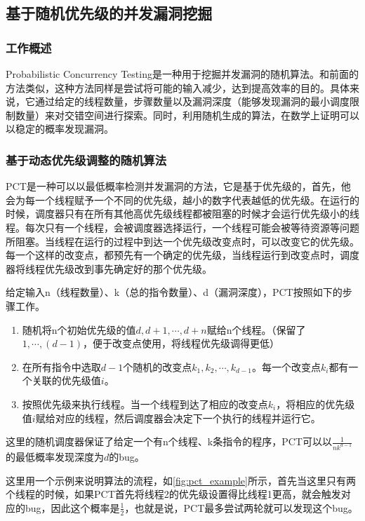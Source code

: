 \subsection{基于随机优先级的并发漏洞挖掘}

\subsubsection{工作概述}

Probabilistic Concurrency Testing是一种用于挖掘并发漏洞的随机算法。和前面的方法类似，这种方法同样是尝试将可能的输入减少，达到提高效率的目的。具体来说，它通过给定的线程数量，步骤数量以及漏洞深度（能够发现漏洞的最小调度限制数量）来对交错空间进行探索。同时，利用随机生成的算法，在数学上证明可以以稳定的概率发现漏洞。

\subsubsection{基于动态优先级调整的随机算法}

PCT是一种可以以最低概率检测并发漏洞的方法，它是基于优先级的，首先，他会为每一个线程赋予一个不同的优先级，越小的数字代表越低的优先级。在运行的时候，调度器只有在所有其他高优先级线程都被阻塞的时候才会运行优先级小的线程。每次只有一个线程，会被调度器选择运行，一个线程可能会被等待资源等问题所阻塞。当线程在运行的过程中到达一个优先级改变点时，可以改变它的优先级。每一个这样的改变点，都预先有一个确定的优先级，当线程运行到改变点时，调度器将线程优先级改到事先确定好的那个优先级。

给定输入n（线程数量）、k（总的指令数量）、d（漏洞深度），PCT按照如下的步骤工作。

\begin{enumerate}
\item 随机将n个初始优先级的值$d, d+1, \cdots, d+n$赋给n个线程。（保留了$1,\cdots, (d-1)$，便于改变点使用，将线程优先级调得更低）
\item 在所有指令中选取$d-1$个随机的改变点$k_1, k_2, \cdots, k_{d-1}$。每一个改变点$k_i$都有一个关联的优先级值$i$。
\item 按照优先级来执行线程。当一个线程到达了相应的改变点$k_i$，将相应的优先级值$i$赋给对应的线程，然后调度器会决定下一个执行的线程并运行它。
\end{enumerate}

这里的随机调度器保证了给定一个有n个线程、k条指令的程序，PCT可以以$\frac{1}{nk^{d-1}}$的最低概率发现深度为$d$的bug。

这里用一个示例来说明算法的流程，如\autoref{fig:pct_example}所示，首先当这里只有两个线程的时候，如果PCT首先将线程2的优先级设置得比线程1更高，就会触发对应的bug，因此这个概率是$\frac{1}{2}$，也就是说，PCT最多尝试两轮就可以发现这个bug。

